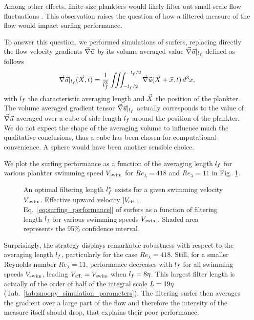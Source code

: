 Among other effects, finite-size plankters would likely filter out small-scale flow fluctuations \citep{qureshi2007turbulent, capecelatro2014numerical}.
This observation raises the question of how a filtered measure of the flow would impact surfing performance.

To answer this question, we performed simulations of surfers, replacing directly the flow velocity gradients $\vec{\nabla} \vec{u}$ by its volume averaged value $\vec{\nabla} \vec{u} |_{l_{f}}$ defined as follows
\begin{equation}\label{eq:filter_length}
	\vec{\nabla} \vec{u} |_{l_{f}} (\vec{X}, t) = \frac{1}{l_{f}^3} \iiint_{-l_{f}/2}^{-l_{f}/2} \vec{\nabla} \vec{u}(\vec{X} + \vec{x}, t) \, d^3 x,
\end{equation}
with $l_{f}$ the characteristic averaging length and $\vec{X}$ the position of the plankter.
The volume averaged gradient tensor $\vec{\nabla} \vec{u} |_{l_{f}}$ actually corresponds to the value of $\vec{\nabla} \vec{u}$ averaged over a cube of side length $l_{f}$ around the position of the plankter.
We do not expect the shape of the averaging volume to influence much the qualitative conclusions, thus a cube has been chosen for computational convenience.
A sphere would have been another sensible choice.

We plot the surfing performance as a function of the averaging length $l_{f}$ for various plankter swimming speed $\SwimmingVelocity$ for $\mathit{Re}_{\lambda} = 418$ and $\mathit{Re}_{\lambda} = 11$ in Fig.~\ref{fig:surfing_filtered}.
\begin{figure}%
	\centering
	
	\caption[An optimal filtering length $\FilterLength^*$ exists for a given swimming velocity $\SwimmingVelocity$.]{
	An optimal filtering length $\FilterLength^*$ exists for a given swimming velocity $\SwimmingVelocity$.
	Effective upward velocity [$V_{\mathrm{eff.}}$, Eq.~\eqref{eq:surfing_performance}] of surfers as a function of filtering length $l_{f}$ for various swimming speeds $\SwimmingVelocity$.
	Shaded area represents the 95\% confidence interval.
	}
	\label{fig:surfing_filtered}
\end{figure}
Surprisingly, the strategy displays remarkable robustness with respect to the averaging length $l_{f}$, particularly for the case $\mathit{Re}_{\lambda} = 418$.
Still, for a smaller Reynolds number $\mathit{Re}_{\lambda} = 11$, performance decreases with $l_{f}$ for all swimming speeds $\SwimmingVelocity$, leading $V_{\mathrm{eff.}} = V_{\mathrm{swim}}$ when $l_{f} = 8 \eta$.
This largest filter length is actually of the order of half of the integral scale $L = 19 \eta$ (Tab.~\ref{tab:snoopy_simulation_parameters}). 
The filtering surfer then averages the gradient over a large part of the flow and therefore the intensity of the measure itself should drop, that explains their poor performance.

